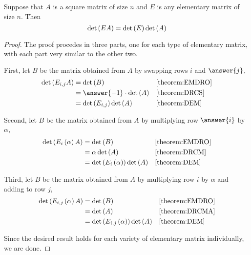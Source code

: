 \documentclass{ximera}
\begin{document}
\begin{theorem}
  \label{theorem:DEMMM}
  Suppose that $A$ is a square matrix of size $n$ and $E$ is any elementary matrix of size $n$.  Then
  \[
    \det\left(EA\right)=\det\left(E\right)\det\left(A\right)
  \]

  \begin{proof}
    The proof procedes in three parts, one for each type of elementary matrix, with each part very similar to the other two.

    First, let $B$ be the matrix obtained from $A$ by swapping rows $i$ and $\answer{j}$,
    \begin{align*}
      \detname{\elemswap{i}{j}A}
      &=\detname{B}&&\ref{theorem:EMDRO}\\
      &=\answer{-1}\cdot\detname{A}&&\ref{theorem:DRCS}\\
      &=\detname{\elemswap{i}{j}}\detname{A}&&\ref{theorem:DEM}
    \end{align*}

    Second, let $B$ be the matrix obtained from $A$ by multiplying row $\answer{i}$ by $\alpha$,
    \begin{align*}
      \det\left(E_{i}\left(\alpha\right)A\right)
      &=\det\left(B\right)&&\ref{theorem:EMDRO}\\
      &=\alpha\det\left(A\right)&&\ref{theorem:DRCM}\\
      &=\det\left(E_{i}\left(\alpha\right)\right)\det\left(A\right)&&\ref{theorem:DEM}
    \end{align*}

    Third, let $B$ be the matrix obtained from $A$ by multiplying row $i$ by $\alpha$ and adding to row $j$,
    \begin{align*}
      \det\left(E_{i,j}\left(\alpha\right)A\right)
      &=\det\left(B\right)&&\ref{theorem:EMDRO}\\
      &=\det\left(A\right)&&\ref{theorem:DRCMA}\\
      &=\det\left(E_{i,j}\left(\alpha\right)\right)\det\left(A\right)&&\ref{theorem:DEM}
    \end{align*}

    Since the desired result holds for each variety of elementary matrix individually, we are done.
  \end{proof}
\end{theorem}
\end{document}
